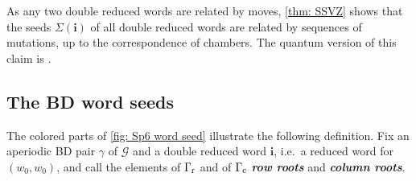 \documentclass[a4paper]{amsart}
\numberwithin{equation}{section}
\theoremstyle{definition}
\theoremstyle{remark}
\newcommand{\mcG}{\mathcal{G}}
\newcommand{\bfi}{\mathbf{i}}
\newcommand{\rr}{{\rm r}}
\newcommand{\cc}{{\rm c}}
\newcommand{\newword}[1]{\textbf{\emph{#1}}}
\begin{document}
\begin{remark}
  As any two double reduced words are related by moves, \cref{thm: SSVZ} shows that the seeds $\Sigma(\bfi)$ of all double reduced words are related by sequences of mutations, up to the correspondence of chambers. The quantum version of this claim is \cite[Theorem~A]{QY25}.
\end{remark}

\subsection{The BD word seeds}
\label{sec: model seeds}
The colored parts of \cref{fig: Sp6 word seed} illustrate the following definition.
Fix an aperiodic BD pair $\gamma$ of $\mcG$ and a double reduced word $\bfi$, i.e.\ a reduced word for $(w_0,w_0)$, and call the elements of $\Gamma_{\rr}$ and of $\Gamma_{\cc}$ \newword{row roots} and \newword{column roots}.
\end{document}
